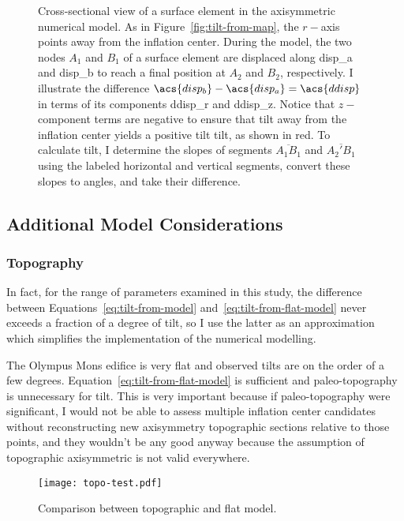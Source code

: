 \begin{figure}
    \caption[Tilt from numerical modelling]{Cross-sectional view of a surface element in the axisymmetric numerical model. As in Figure~\ref{fig:tilt-from-map}, the $r-$axis points away from the inflation center. During the model, the two nodes $A_1$ and $B_1$ of a surface element are displaced along \acs{disp_a} and \acs{disp_b} to reach a final position at $A_2$ and $B_2$, respectively. I illustrate the difference $\acs{disp_b} - \acs{disp_a} = \acs{ddisp}$ in terms of its components \acs{ddisp_r} and \acs{ddisp_z}. Notice that $z-$component terms are negative to ensure that tilt away from the inflation center yields a positive tilt \acs{tilt}, as shown in red. To calculate \acs{tilt}, I determine the slopes of segments $\overline{A_1B_1}$ and $\overline{A_2'B_1}$ using the labeled horizontal and vertical segments, convert these slopes to angles, and take their difference.}%
    \label{fig:tilt-from-model}%
\end{figure}

\subsection{Additional Model Considerations}

\subsubsection{Topography}

In fact, for the range of parameters examined in this study, the difference between Equations~\eqref{eq:tilt-from-model} and~\eqref{eq:tilt-from-flat-model} never exceeds a fraction of a degree of tilt, so I use the latter as an approximation which simplifies the implementation of the numerical modelling.

The Olympus Mons edifice is very flat and observed tilts are on the order of a few degrees. Equation~\eqref{eq:tilt-from-flat-model} is sufficient and paleo-topography is unnecessary for tilt. This is very important because if paleo-topography were significant, I would not be able to assess multiple inflation center candidates without reconstructing new axisymmetry topographic sections relative to those points, and they wouldn't be any good anyway because the assumption of topographic axisymmetric is not valid everywhere.

\begin{figure}
    \texttt{[image: topo-test.pdf]}
    \caption[Flat Model]{Comparison between topographic and flat model.}%
    \label{fig:topo-test}%
\end{figure}

